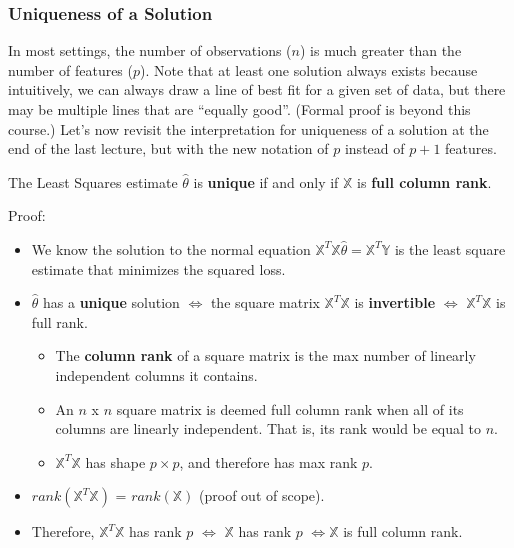 \documentclass[
  letterpaper,
  DIV=11,
  numbers=noendperiod]{scrreprt}
\providecommand{\tightlist}{%
  \setlength{\itemsep}{0pt}\setlength{\parskip}{0pt}}\usepackage{longtable,booktabs,array}
\begin{document}
\subsubsection{Uniqueness of a Solution}\label{uniqueness-of-a-solution}

In most settings, the number of observations (\(n\)) is much greater
than the number of features (\(p\)). Note that at least one solution
always exists because intuitively, we can always draw a line of best fit
for a given set of data, but there may be multiple lines that are
``equally good''. (Formal proof is beyond this course.) Let's now
revisit the interpretation for uniqueness of a solution at the end of
the last lecture, but with the new notation of \(p\) instead of \(p+1\)
features.

The Least Squares estimate \(\hat{\theta}\) is \textbf{unique} if and
only if \(\mathbb{X}\) is \textbf{full column rank}.

\begin{tcolorbox}[enhanced jigsaw, arc=.35mm, colback=white, toprule=.15mm, leftrule=.75mm, bottomrule=.15mm, colframe=quarto-callout-color-frame, rightrule=.15mm, breakable, opacityback=0, left=2mm]

Proof:

\begin{itemize}
\tightlist
\item
  We know the solution to the normal equation
  \(\mathbb{X}^T\mathbb{X}\hat{\theta} = \mathbb{X}^T\mathbb{Y}\) is the
  least square estimate that minimizes the squared loss.
\item
  \(\hat{\theta}\) has a \textbf{unique} solution \(\iff\) the square
  matrix \(\mathbb{X}^T\mathbb{X}\) is \textbf{invertible} \(\iff\)
  \(\mathbb{X}^T\mathbb{X}\) is full rank.

  \begin{itemize}
  \tightlist
  \item
    The \textbf{column rank} of a square matrix is the max number of
    linearly independent columns it contains.
  \item
    An \(n\) x \(n\) square matrix is deemed full column rank when all
    of its columns are linearly independent. That is, its rank would be
    equal to \(n\).
  \item
    \(\mathbb{X}^T\mathbb{X}\) has shape \(p \times p\), and therefore
    has max rank \(p\).
  \end{itemize}
\item
  \(rank(\mathbb{X}^T\mathbb{X})\) = \(rank(\mathbb{X})\) (proof out of
  scope).
\item
  Therefore, \(\mathbb{X}^T\mathbb{X}\) has rank \(p\) \(\iff\)
  \(\mathbb{X}\) has rank \(p\) \(\iff \mathbb{X}\) is full column rank.
\end{itemize}

\end{tcolorbox}
\end{document}

